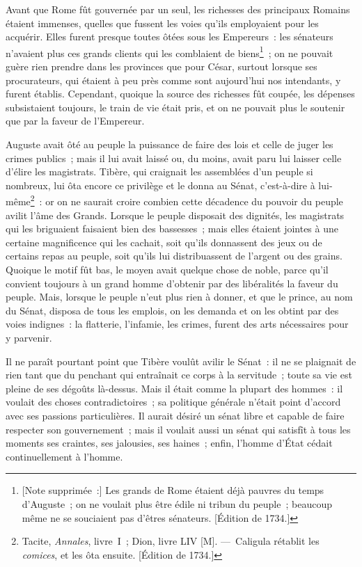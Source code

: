 \documentclass[french,twoside]{book} %
\begin{document}
Avant que Rome fût gouvernée par un seul, les richesses des principaux Romains étaient immenses, quelles que fussent les voies qu’ils employaient pour les acquérir. Elles furent presque toutes ôtées sous les Empereurs : les sénateurs n’avaient plus ces grands clients qui les comblaient de biens\footnote{[Note supprimée :] Les grands de Rome étaient déjà pauvres du temps d’Auguste ; on ne voulait plus être édile ni tribun du peuple ; beaucoup même ne se souciaient pas d’êtres sénateurs. [Édition de 1734.]} ; on ne pouvait guère rien prendre dans les provinces que pour César, surtout lorsque ses procurateurs, qui étaient à peu près comme sont aujourd’hui nos intendants, y furent établis. Cependant, quoique la source des richesses fût coupée, les dépenses subsistaient toujours, le train de vie était pris, et on ne pouvait plus le soutenir que par la faveur de l’Empereur.\par
Auguste avait ôté au peuple la puissance de faire des lois et celle de juger les crimes publics ; mais il lui avait laissé ou, du moins, avait paru lui laisser celle d’élire les magistrats. Tibère, qui craignait les assemblées d’un peuple si nombreux, lui ôta encore ce privilège et le donna au Sénat, c’est-à-dire à lui-même\footnote{Tacite, {\itshape Annales}, livre I ; Dion, livre LIV [M]. — Caligula rétablit les {\itshape comices}, et les ôta ensuite. [Édition de 1734.]} : or on ne saurait croire combien cette décadence du pouvoir du peuple avilit l’âme des Grands. Lorsque le peuple disposait des dignités, les magistrats qui les briguaient faisaient bien des bassesses ; mais elles étaient jointes à une certaine magnificence qui les cachait, soit qu’ils donnassent des jeux ou de certains repas au peuple, soit qu’ils lui distribuassent de l’argent ou des grains. Quoique le motif fût bas, le moyen avait quelque chose de noble, parce qu’il convient toujours à un grand homme d’obtenir par des libéralités la faveur du peuple. Mais, lorsque le peuple n’eut plus rien à donner, et que le prince, au nom du Sénat, disposa de tous les emplois, on les demanda et on les obtint par des voies indignes : la flatterie, l’infamie, les crimes, furent des arts nécessaires pour y parvenir.\par
Il ne paraît pourtant point que Tibère voulût avilir le Sénat : il ne se plaignait de rien tant que du penchant qui entraînait ce corps à la servitude ; toute sa vie est pleine de ses dégoûts là-dessus. Mais il était comme la plupart des hommes : il voulait des choses contradictoires ; sa politique générale n’était point d’accord avec ses passions particulières. Il aurait désiré un sénat libre et capable de faire respecter son gouvernement ; mais il voulait aussi un sénat qui satisfît à tous les moments ses craintes, ses jalousies, ses haines ; enfin, l’homme d’État cédait continuellement à l’homme.\par
\end{document}
